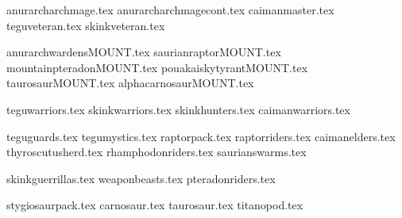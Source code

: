 
{}
{anurarcharchmage.tex}
\pagebreak{}
{anurarcharchmagecont.tex}
{caimanmaster.tex}
{teguveteran.tex}
{skinkveteran.tex}

\clearpage
{}
{anurarchwardensMOUNT.tex}
{saurianraptorMOUNT.tex}
{mountainpteradonMOUNT.tex}
{pouakaiskytyrantMOUNT.tex}
{taurosaurMOUNT.tex}
{alphacarnosaurMOUNT.tex}

\clearpage
{}
{teguwarriors.tex}
{skinkwarriors.tex}
{skinkhunters.tex}
{caimanwarriors.tex}

\clearpage
{}
{teguguards.tex}
{tegumystics.tex}
{raptorpack.tex}
{raptorriders.tex}
{caimanelders.tex}
{thyroscutusherd.tex}
{rhamphodonriders.tex}
{saurianswarms.tex}

\clearpage
{}
{skinkguerrillas.tex}
{weaponbeasts.tex}
{pteradonriders.tex}

\clearpage
{}
{stygiosaurpack.tex}
{carnosaur.tex}
{taurosaur.tex}
{titanopod.tex}
